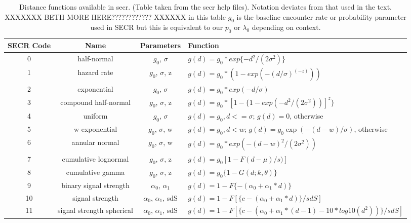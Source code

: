 \begin{table}
\centering
\caption{Distance functions available in secr.  (Table taken from the secr
help files). Notation deviates from that used in the text. 
XXXXXXX BETH MORE HERE???????????? XXXXXX
in this table $g_{0}$ is the baseline encounter rate or probability
parameter used in SECR but this is equivalent to our $p_{0}$ or
$\lambda_{0}$ depending on context. 
}
\begin{tabular}{cccl}
\hline \hline 
SECR Code & Name & Parameters & Function  \\ \hline
0 & half-normal &$g_0$, $\sigma$                 &  $g(d) = g_0 * exp\{-d^2 / (2  \sigma^2) \}$  \\
1 &hazard rate & $g_0$, $\sigma$, z              &  $g(d) = g_0 * (1 - exp(- (d / \sigma) ^(-z) ))$ \\
2 &exponential              &$g_0$, $\sigma$    &  $g(d) = g_0 * exp(- d / \sigma)$ \\
3 &compound half-normal      & $g_0$, $\sigma$, z & $g(d) = g_0 * [1 - \{1 - exp(-d^2 / (2 \sigma^2))]^z\}$ \\
4 &uniform                  & $g_0$, $\sigma$     & 
\parbox[t]{2in}{ $g(d) = g_{0}, d<=\sigma$; \\ 
                 $g(d)= 0$, otherwise 
} \\
5 &w exponential            & $g_0$, $\sigma$, w & 
\parbox[t]{2in}{ $g(d) = g_{0}, d < w$; \\
                 $g(d) = g_{0} \exp(- (d - w) / \sigma)$, otherwise
} \\
6 &annular normal           & $g_0$, $\sigma$, w & $g(d) = g_0 * exp(-(d-w)^2 / (2 \sigma^2))$ \\
7 &cumulative lognormal     & $g_0$, $\sigma$, z & $g(d) = g_0 [1 -F{(d-\mu)/s)}]$  \\
8 &cumulative gamma         & $g_0$, $\sigma$, z  & $g(d) = g_0 \{ 1 - G (d; k,  \theta) \}$  \\
9 &binary signal strength   & $\alpha_0$, $\alpha_1$       & $g(d) = 1 - F \{- (\alpha_0 + \alpha_1 * d) \}$ \\
10&signal strength          & $\alpha_0$, $\alpha_1$, sdS  & 
  $g(d) = 1 - F[ \{c - (\alpha_0 + \alpha_1 * d)\} / sdS]$  \\
11&signal strength spherical&  $\alpha_0$, $\alpha_1$, sdS & $g(d) = 1 - F[\{c - (\alpha_0 + \alpha_1 * (d-1) - 10 * log10 ( d^2 ) ) \} / sdS ]$
\end{tabular}
\label{covariates.tab.detmodels}
\end{table}

